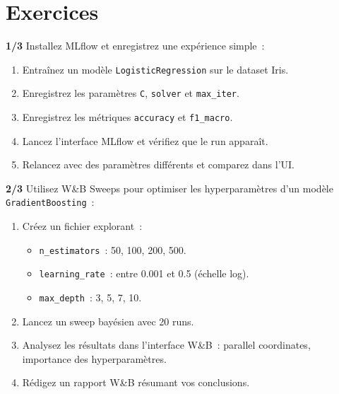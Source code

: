 \section{Exercices}
\label{sec:exos-suivi-experiences}

\begin{exercice}
\textbf{1/3}
Installez MLflow et enregistrez une exp\'erience simple~:
\begin{enumerate}
  \item Entra\^inez un mod\`ele \texttt{LogisticRegression} sur le dataset Iris.
  \item Enregistrez les param\`etres \texttt{C}, \texttt{solver} et
        \texttt{max\_iter}.
  \item Enregistrez les m\'etriques \texttt{accuracy} et \texttt{f1\_macro}.
  \item Lancez l'interface MLflow et v\'erifiez que le run appara\^it.
  \item Relancez avec des param\`etres diff\'erents et comparez dans l'UI.
\end{enumerate}
\end{exercice}

\begin{exercice}
\textbf{2/3}
Utilisez W\&B Sweeps pour optimiser les hyperparam\`etres d'un mod\`ele
\texttt{GradientBoosting}~:
\begin{enumerate}
  \item Cr\'eez un fichier  explorant~:
    \begin{itemize}
      \item \texttt{n\_estimators}~: 50, 100, 200, 500.
      \item \texttt{learning\_rate}~: entre 0.001 et 0.5 (\'echelle log).
      \item \texttt{max\_depth}~: 3, 5, 7, 10.
    \end{itemize}
  \item Lancez un sweep bay\'esien avec 20 runs.
  \item Analysez les r\'esultats dans l'interface W\&B~: parallel coordinates,
        importance des hyperparam\`etres.
  \item R\'edigez un rapport W\&B r\'esumant vos conclusions.
\end{enumerate}
\end{exercice}

